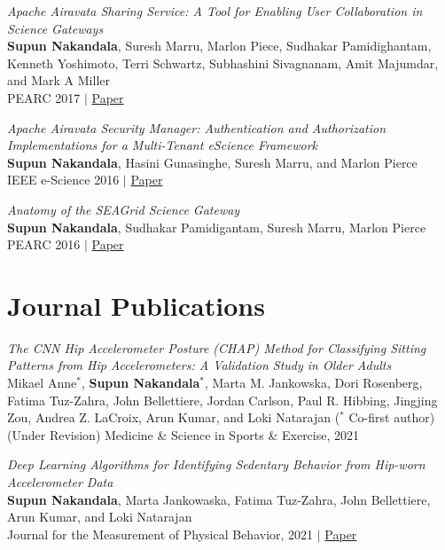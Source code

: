 \documentclass[margin]{res}
\begin{document}
\begin{resume}
\par
\textit{Apache Airavata Sharing Service: A Tool for Enabling User Collaboration in Science Gateways} \\
\textbf{Supun Nakandala}, Suresh Marru, Marlon Piece, Sudhakar Pamidighantam, Kenneth Yoshimoto, Terri Schwartz, Subhashini Sivagnanam, Amit Majumdar, and Mark A Miller\\
PEARC 2017 $|$ \href{https://dl.acm.org/doi/10.1145/3093338.3093359}{Paper}

\par
\textit{Apache Airavata Security Manager: Authentication and Authorization Implementations for a Multi-Tenant eScience Framework} \\
\textbf{Supun Nakandala}, Hasini Gunasinghe, Suresh Marru, and Marlon Pierce\\
IEEE e-Science 2016 $|$ \href{https://scholarworks.iu.edu/dspace/bitstream/handle/2022/21092/airavata-security-escience16.pdf;jsessionid=58FF59D4EDF8DA7C45FB89F78B187A3C?sequence=1}{Paper}

\par
\textit{Anatomy of the SEAGrid Science Gateway} \\
\textbf{Supun Nakandala}, Sudhakar Pamidigantam, Suresh Marru, Marlon Pierce\\
PEARC 2016 $|$ \href{https://dl.acm.org/doi/pdf/10.1145/2949550.2949591}{Paper}


\section{Journal Publications}
\par
\textit{The CNN Hip Accelerometer Posture (CHAP) Method for Classifying Sitting Patterns from Hip Accelerometers: A Validation Study in Older Adults} \\
Mikael Anne$^*$, \textbf{Supun Nakandala}$^*$, Marta M. Jankowska, Dori Rosenberg, Fatima Tuz-Zahra, John Bellettiere, Jordan Carlson, Paul R. Hibbing, Jingjing Zou, Andrea Z. LaCroix, Arun Kumar, and Loki Natarajan ($^*$ Co-first author)\\
(Under Revision) Medicine \& Science in Sports \& Exercise, 2021

\par
\textit{Deep Learning Algorithms for Identifying Sedentary Behavior from Hip-worn Accelerometer Data} \\
\textbf{Supun Nakandala}, Marta Jankowaska, Fatima Tuz-Zahra, John Bellettiere, Arun Kumar, and Loki Natarajan\\
Journal for the Measurement of Physical Behavior, 2021 $|$ \href{https://adalabucsd.github.io/papers/2021_JMPB_CNN.pdf}{Paper}


\end{resume}
\end{document}
